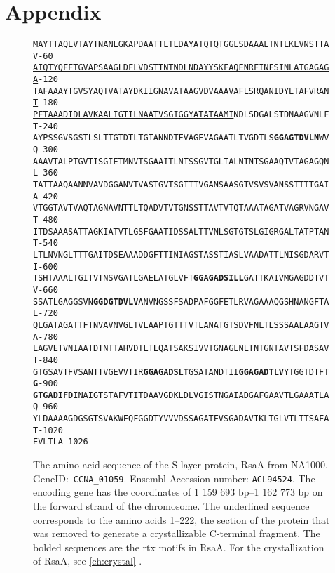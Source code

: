 \chapter*{Appendix}
\begin{figure}[htb]
  	\begin{center}
\label{app:rsaseq}
\texttt{\singlespacing\small\underline{MAYTTAQLVTAYTNANLGKAPDAATTLTLDAYATQTQTGGLSDAAALTNTLKLVNSTTAV}\hfill-60~~\\
\underline{AIQTYQFFTGVAPSAAGLDFLVDSTTNTNDLNDAYYSKFAQENRFINFSINLATGAGAGA}\hfill-120~\\
\underline{TAFAAAYTGVSYAQTVATAYDKIIGNAVATAAGVDVAAAVAFLSRQANIDYLTAFVRANT}\hfill-180~\\
\underline{PFTAAADIDLAVKAALIGTILNAATVSGIGGYATATAAMI}NDLSDGALSTDNAAGVNLFT\hfill-240~\\
AYPSSGVSGSTLSLTTGTDTLTGTANNDTFVAGEVAGAATLTVGDTLS\textbf{GGAGTDVLN}WVQ\hfill-300~\\
AAAVTALPTGVTISGIETMNVTSGAAITLNTSSGVTGLTALNTNTSGAAQTVTAGAGQNL\hfill-360~\\
TATTAAQAANNVAVDGGANVTVASTGVTSGTTTVGANSAASGTVSVSVANSSTTTTGAIA\hfill-420~\\
VTGGTAVTVAQTAGNAVNTTLTQADVTVTGNSSTTAVTVTQTAAATAGATVAGRVNGAVT\hfill-480~\\
ITDSAAASATTAGKIATVTLGSFGAATIDSSALTTVNLSGTGTSLGIGRGALTATPTANT\hfill-540~\\
LTLNVNGLTTTGAITDSEAAADDGFTTINIAGSTASSTIASLVAADATTLNISGDARVTI\hfill-600~\\
TSHTAAALTGITVTNSVGATLGAELATGLVFT\textbf{GGAGADSILL}GATTKAIVMGAGDDTVTV\hfill-660~\\
SSATLGAGGSVN\textbf{GGDGTDVLV}ANVNGSSFSADPAFGGFETLRVAGAAAQGSHNANGFTAL\hfill-720~\\
QLGATAGATTFTNVAVNVGLTVLAAPTGTTTVTLANATGTSDVFNLTLSSSAALAAGTVA\hfill-780~\\
LAGVETVNIAATDTNTTAHVDTLTLQATSAKSIVVTGNAGLNLTNTGNTAVTSFDASAVT\hfill-840~\\
GTGSAVTFVSANTTVGEVVTIR\textbf{GGAGADSLT}GSATANDTII\textbf{GGAGADTLV}YTGGTDTFT\textbf{G}\hfill-900~\\
\textbf{GTGADIFD}INAIGTSTAFVTITDAAVGDKLDLVGISTNGAIADGAFGAAVTLGAAATLAQ\hfill-960~\\
YLDAAAAGDGSGTSVAKWFQFGGDTYVVVDSSAGATFVSGADAVIKLTGLVTLTTSAFAT\hfill-1020\\
EVLTLA\hfill-1026}
   	\end{center}
   	\caption[RsaA, amino acid sequence]{
   The amino acid sequence of the \ac{S-layer} protein, RsaA from \caulobacter{} NA1000. GeneID:~\texttt{CCNA\_01059}. Ensembl Accession number: \texttt{ACL94524}. The encoding gene has the coordinates of 1 159 693 bp--1 162 773 bp on the forward strand of the \caulobacter chromosome. The underlined sequence corresponds to the amino acids 1--222, the section of the protein that was removed to generate a crystallizable C-terminal fragment. The bolded sequences are the \ac{rtx} motifs in RsaA. For the crystallization of RsaA, see \cref{ch:crystal} .}
   	

\end{figure}
